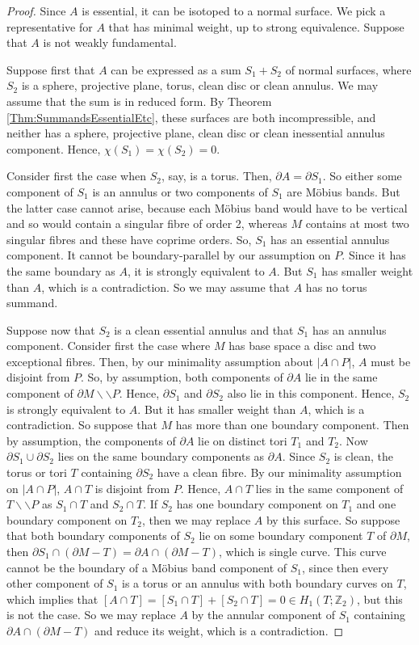\documentclass[oneside]{amsart}
\numberwithin{equation}{section}
\theoremstyle{plain}
\theoremstyle{definition}
\newcommand{\cut}{\backslash\backslash}
\begin{document}
\begin{proof}
Since $A$ is essential, it can be isotoped to a normal surface. We pick a 
representative for $A$ that has minimal weight, up to strong equivalence. 
Suppose that $A$ is not weakly fundamental.

Suppose first that $A$ can be expressed as a sum
$S_1 + S_2$ of normal surfaces, where $S_2$ is a sphere, projective plane, torus, clean disc or clean annulus. We may assume
that the sum is in reduced form.
By Theorem \ref{Thm:SummandsEssentialEtc}, these surfaces are both incompressible,
and neither has a sphere, projective plane, clean disc or clean inessential annulus component. Hence, $\chi(S_1) = \chi(S_2) = 0$.

Consider first the case when $S_2$, say, is a torus. Then, $\partial A = \partial S_1$.
So either some component of $S_1$ is an annulus or two components of $S_1$ are
M\"obius bands. But the latter case cannot arise, because each M\"obius band would have to be vertical and so would contain
a singular fibre of order 2, whereas $M$ contains at most two singular fibres and these have coprime orders.
So, $S_1$ has an essential annulus component. It cannot be boundary-parallel by our assumption on $P$.
Since it has the same boundary as $A$, it
is strongly equivalent to $A$. But $S_1$ has smaller weight than $A$, which is a contradiction.
So we may assume that $A$ has no torus summand.

Suppose now that $S_2$ is a clean essential annulus and that $S_1$ has an annulus component. 
Consider first the case where $M$ has base space a disc and two exceptional fibres.
Then, by our minimality assumption about $|A \cap P|$, $A$ must be disjoint from $P$.
So, by assumption, both components of $\partial A$ lie in the
same component of $\partial M \cut P$. Hence, $\partial S_1$ and
$\partial S_2$ also lie in this component. Hence, $S_2$ is strongly
equivalent to $A$. But it has smaller weight than $A$, which is a contradiction.
So suppose that $M$ has more than one boundary component. Then by assumption, the components of $\partial A$
lie on distinct tori $T_1$ and $T_2$. Now $\partial S_1 \cup \partial S_2$
lies on the same boundary components as $\partial A$. Since $S_2$ is clean,
the torus or tori $T$ containing $\partial S_2$ have a clean fibre. By our minimality 
assumption on $|A \cap P|$, $A \cap T$ is disjoint from $P$. Hence, $A \cap T$ lies
in the same component of $T \cut P$ as $S_1 \cap T$ and $S_2 \cap T$.
If $S_2$ has one boundary component
on $T_1$ and one boundary component on $T_2$, then we may replace $A$ by this surface.
So suppose that both boundary components of $S_2$ lie on some boundary
component $T$ of $\partial M$, then $\partial S_1 \cap (\partial M - T) = \partial A \cap (\partial M - T)$,
which is single curve. This curve cannot be the boundary of a M\"obius band component of $S_1$,
since then every other component of $S_1$ is a torus or an annulus with both boundary curves on $T$,
which implies that $[A \cap T] = [S_1 \cap T] + [S_2 \cap T] =0 \in H_1(T; \mathbb{Z}_2)$,
but this is not the case.
So we may replace $A$ by the annular component of $S_1$ containing $\partial A \cap (\partial M - T)$
and reduce its weight, which is a contradiction.


\end{proof}
\end{document}
